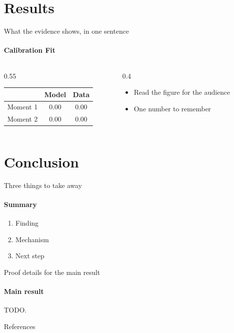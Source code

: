 \documentclass{style/fulbright-slides}
\begin{document}
\section{Results}

\begin{frame}{What the evidence shows, in one sentence}
  \framesubtitle{Calibration \textperiodcentered{} Fit}
  \begin{columns}[T]
    \begin{column}{0.55\textwidth}
      \centering\small
      \begin{tabular}{lcc}
        \toprule
                & Model & Data \\
        \midrule
        Moment 1 & 0.00  & 0.00 \\
        Moment 2 & 0.00  & 0.00 \\
        \bottomrule
      \end{tabular}
    \end{column}
    \begin{column}{0.4\textwidth}
      \begin{itemize}
        \item Read the figure for the audience
        \item \alert{One number to remember}
      \end{itemize}
    \end{column}
  \end{columns}
\end{frame}


\section{Conclusion}

\begin{frame}{Three things to take away}
  \framesubtitle{Summary}
  \begin{enumerate}
    \item Finding
    \item Mechanism
    \item Next step
  \end{enumerate}
\end{frame}


\backupslides

\begin{frame}{Proof details for the main result}
  \framesubtitle{Main result}
  TODO.
\end{frame}

\begin{frame}[allowframebreaks]{References}
  \footnotesize
  
\end{frame}
\end{document}
